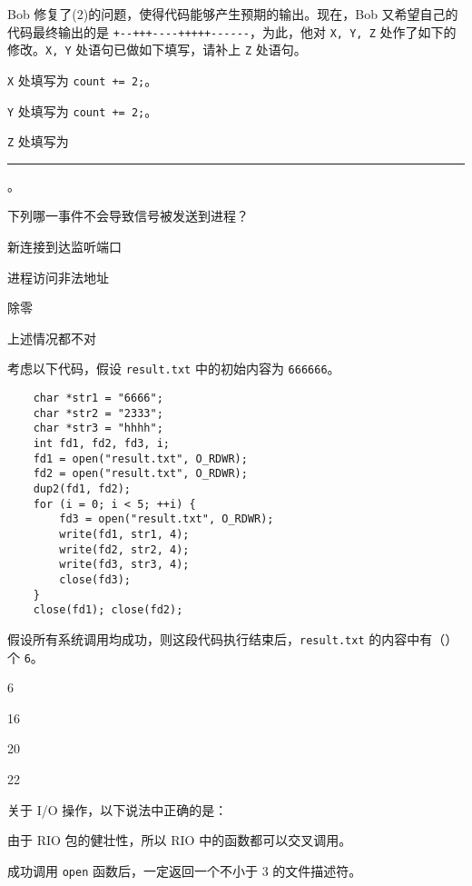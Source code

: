 \begin{problems}
        \qn Bob 修复了(2)的问题，使得代码能够产生预期的输出。现在，Bob 又希望自己的代码最终输出的是 \verb|+--+++----+++++------|，为此，他对 \verb|X, Y, Z| 处作了如下的修改。\verb|X, Y| 处语句已做如下填写，请补上 \verb|Z| 处语句。
        \begin{compactitem}
            \item \verb|X| 处填写为 \verb|count += 2;|。
            \item \verb|Y| 处填写为 \verb|count += 2;|。
            \item \verb|Z| 处填写为 \rule{6cm}{0.25mm}。
        \end{compactitem}
         下列哪一事件不会导致信号被发送到进程？
        \begin{choices}
            \item 新连接到达监听端口
            \item 进程访问非法地址
            \item 除零
            \item 上述情况都不对
        \end{choices}
         考虑以下代码，假设 \verb|result.txt| 中的初始内容为 \verb|666666|。
        \begin{verbatim}
    char *str1 = "6666";
    char *str2 = "2333";
    char *str3 = "hhhh";
    int fd1, fd2, fd3, i;
    fd1 = open("result.txt", O_RDWR);
    fd2 = open("result.txt", O_RDWR);
    dup2(fd1, fd2);
    for (i = 0; i < 5; ++i) {
        fd3 = open("result.txt", O_RDWR);
        write(fd1, str1, 4);
        write(fd2, str2, 4);
        write(fd3, str3, 4);
        close(fd3);
    }
    close(fd1); close(fd2);
        \end{verbatim}
        假设所有系统调用均成功，则这段代码执行结束后，\verb|result.txt| 的内容中有（\qquad）个 \verb|6|。
        \begin{choices}
            \item 6
            \item 16
            \item 20
            \item 22
        \end{choices}
         关于 I/O 操作，以下说法中正确的是：
        \begin{choices}
            \item 由于 RIO 包的健壮性，所以 RIO 中的函数都可以交叉调用。
            \item 成功调用 \verb|open| 函数后，一定返回一个不小于 3 的文件描述符。

\end{choices}
\end{problems}
